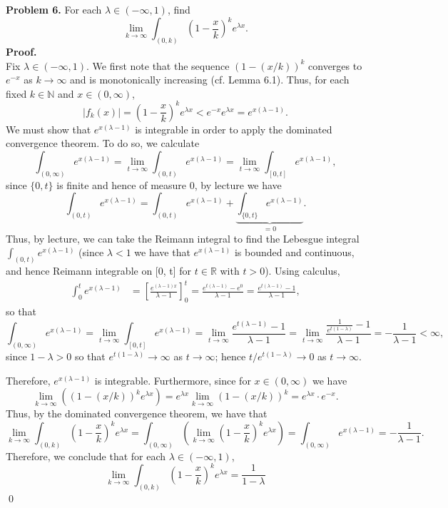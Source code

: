 \noindent \textbf{Problem 6.} For each \( \lambda \in (-\infty,1) \), find \[\lim_{{k} \to {\infty}} \int_{(0,k)} \left(1 - \frac{x}{k} \right)^{k}e^{\lambda x } . \]
\noindent \textbf{Proof.} \\
Fix \( \lambda \in (-\infty,1) \). We first note that the sequence \( (1- (x/k))^{k}  \) converges to \( e^{-x}  \) as \( k \to \infty \) and is monotonically increasing (cf. Lemma 6.1). Thus, for each fixed \( k \in \mathbb{N}  \) and \( x \in (0,\infty) \), \[|f_{k}(x)| = \left ( {1-\frac{x}{k} } \right ) ^{k} e^{\lambda x} < e^{-x}e^{\lambda x} = e^{x (\lambda - 1)}.      \] We must show that \( e^{x(\lambda - 1)}  \) is integrable in order to apply the dominated convergence theorem. To do so, we calculate \[\int_{(0,\infty)} e^{x(\lambda - 1)} = \lim_{{t} \to {\infty}} \int_{(0,t)}e^{x(\lambda - 1)} = \lim_{{t} \to {\infty}} \int_{[0,t]} e^{x(\lambda - 1)}, \] since \( \{ 0,t \}  \) is finite and hence of measure 0, by lecture we have \[ \int_{(0,t)} e^{x(\lambda -1)} = \int_{(0,t)}e^{x(\lambda -1)} + \underbrace{\int_{\{0,t\}}  e^{x(\lambda - 1)} }_{=0} .\] Thus, by lecture, we can take the Reimann integral to find the Lebesgue integral \( \int_{(0,t)} e^{x(\lambda - 1)}  \) (since \( \lambda < 1 \) we have that \( e^{x(\lambda - 1)}  \) is bounded and continuous, and hence Reimann integrable on [0, t] for \( t \in \mathbb{R} \) with \( t > 0 \)). Using calculus,
\begin{align*}
	\int_{0}^{t} e^{x(\lambda - 1)}   &= \left [ \frac{e^{(\lambda - 1)x} }{\lambda - 1} \right ]_{0}^{t} = \frac{e^{t(\lambda - 1)} - e^{0}  }{\lambda - 1}  = \frac{e^{t(\lambda - 1)} - 1 }{\lambda - 1}, \tag{this is the Reimann integral}
\end{align*}
so that \[\int_{(0,\infty)}e^{x(\lambda - 1)}  = \lim_{{t} \to {\infty}} \int_{[0,t]} e^{x(\lambda - 1)} = \lim_{{t} \to {\infty}} \frac{e^{t(\lambda - 1)} - 1}{\lambda - 1} = \lim_{{t} \to {\infty}} \frac{\frac{1}{e^{t(1-\lambda)} } - 1 }{\lambda - 1} = -\frac{1}{\lambda - 1} < \infty,   \] since \( 1 - \lambda > 0 \) so that \( e^{t(1-\lambda)} \to \infty \) as \( t \to \infty \); hence \( t/e^{t(1 - \lambda)} \to 0 \) as \( t\to \infty \).

Therefore, \( e^{x(\lambda - 1)}  \) is integrable. Furthermore, since for \( x \in (0,\infty) \) we have \[ \lim_{{k} \to {\infty}} ((1-(x/k))^{k}e^{\lambda x}) = e^{\lambda x} \lim_{{k} \to {\infty}} (1-(x/k))^{k} = e^{\lambda x }\cdot e^{-x}     .   \] Thus, by the dominated convergence theorem, we have that \[\lim_{{k} \to {\infty}} \int_{(0,k)} \left ( {1 - \frac{x}{k} } \right )^{k} e^{\lambda x} = \int_{(0,\infty)} \left (\lim_{{k} \to {\infty}}\left (1-\frac{x}{k} \right)^{k}e^{\lambda x}  \right)  = \int_{(0,\infty)} e^{x(\lambda - 1)} = -\frac{1}{\lambda - 1}.    \]
Therefore, we conclude that for each \( \lambda \in (-\infty,1) \), \[\boxed{\lim_{{k} \to {\infty}} \int_{(0,k)} \left ( {1 - \frac{x}{k} } \right )^{k} e^{\lambda x} = \frac{1}{1 - \lambda}   }\] \qed \\

